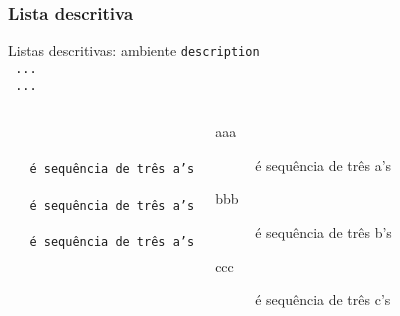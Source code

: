 \begin{frame}
  \frametitle{Lista descritiva}
    \begin{block}{Listas descritivas: ambiente \texttt{description}}
    \texttt{\\
        \purple{\string\item}\ ...\\
        \purple{\string\item}\ ...\\
        }
  \end{block}

  \begin{exemplo}

    \begin{columns}[c]
      \column{5.5cm}
      \texttt{\\
          \purple{\string\item}\redunder{[aaa]}\\
          \ \ \ é\ sequência\ de\ três\ a's\\
          \purple{\string\item}\redunder{[bbb]}\\
          \ \ \ é\ sequência\ de\ três\ a's\\
          \purple{\string\item}\redunder{[ccc]}\\
          \ \ \ é\ sequência\ de\ três\ a's\\
          }
      \column{4.2cm}
      \begin{description}
      \item[aaa] é sequência de três a's
      \item[bbb] é sequência de três b's
      \item[ccc] é sequência de três c's
      \end{description}
    \end{columns}

  \end{exemplo}

\end{frame}


